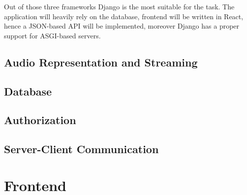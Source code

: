 Out of those three frameworks Django is the most suitable for the task.
The application will heavily rely on the database,
frontend will be written in React, hence a JSON-based API will be implemented,
moreover Django has a proper support for ASGI-based servers.

\subsection{Audio Representation and Streaming}

\subsection{Database}

\subsection{Authorization}

\subsection{Server-Client Communication}


\section{Frontend}